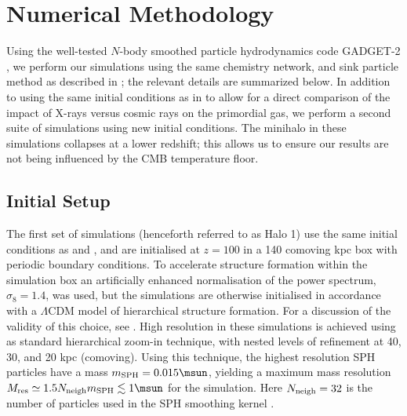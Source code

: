 \section{Numerical Methodology}
\label{sec:methods}
Using the well-tested $N$-body smoothed particle hydrodynamics code GADGET-2 \citep{Springel2005}, we perform our simulations using the same chemistry network, and sink particle method as described in \citet{Hummeletal2015}; the relevant details are summarized below.  In addition to using the same initial conditions as in \citet{Hummeletal2015} to allow for a direct comparison of the impact of X-rays versus cosmic rays on the primordial gas, we perform a second suite of simulations using new initial conditions.  The minihalo in these simulations collapses at a lower redshift; this allows us to ensure our results are not being influenced by the CMB temperature floor.

\subsection{Initial Setup}
\label{setup}
The first set of simulations (henceforth referred to as Halo 1) use the same initial conditions as \citet{Hummeletal2015} and \citet{StacyGreifBromm2010}, and are initialised at $z=100$ in a 140 comoving kpc box with periodic boundary conditions. To accelerate structure formation within the simulation box an artificially enhanced normalisation of the power spectrum, $\sigma_8 = 1.4$, was used, but the simulations are otherwise initialised in accordance with a $\Lambda$CDM model of hierarchical structure formation. For a discussion of the validity of this choice, see \citet{StacyGreifBromm2010}. High resolution in these simulations is achieved using as standard hierarchical zoom-in technique, with nested levels of refinement at 40, 30, and 20 kpc (comoving).  Using this technique, the highest resolution SPH particles have a mass $m_{\rm SPH} = 0.015\msun$, yielding a maximum mass resolution $M_{\rm res} \simeq 1.5 N_{\rm neigh} m_{\rm SPH} \lesssim 1\msun$ for the simulation.  Here $N_{\rm neigh} = 32$ is the number of particles used in the SPH smoothing kernel \citep{BateBurkert1997}.

